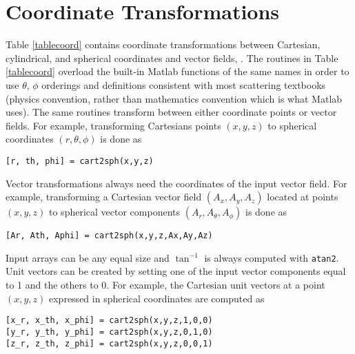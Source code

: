 
\section{Coordinate Transformations}

Table \ref{tablecoord} contains coordinate transformations between Cartesian, cylindrical, and spherical coordinates and vector fields, \cite{ulaby1999fundamentals}. The routines in Table \ref{tablecoord} overload the built-in Matlab functions of the same names in order to use $\theta$, $\phi$ orderings and definitions consistent with most scattering textbooks (physics convention, rather than mathematics convention which is what Matlab uses).  The same routines transform between either coordinate points or vector fields. For example, transforming Cartesians points $(x,y,z)$ to spherical coordinates $(r,\theta,\phi)$ is done as
\begin{verbatim}
[r, th, phi] = cart2sph(x,y,z)
\end{verbatim}

Vector transformations always need the coordinates of the input vector field. For example, transforming a Cartesian vector field $(A_x,A_y,A_z)$ located at points $(x,y,z)$ to spherical vector components $(A_r,A_{\theta},A_{\phi})$ is done as
\begin{verbatim}
[Ar, Ath, Aphi] = cart2sph(x,y,z,Ax,Ay,Az)
\end{verbatim}

Input arrays can be any equal size and $\tan^{-1}$ is always computed with \texttt{atan2}. Unit vectors can be created by setting one of the input vector components equal to 1 and the others to 0.  For example, the Cartesian unit vectors at a point $(x,y,z)$ expressed in spherical coordinates are computed as
\begin{verbatim}
[x_r, x_th, x_phi] = cart2sph(x,y,z,1,0,0) 
[y_r, y_th, y_phi] = cart2sph(x,y,z,0,1,0)  
[z_r, z_th, z_phi] = cart2sph(x,y,z,0,0,1) 
\end{verbatim}

\clearpage
\newpage


